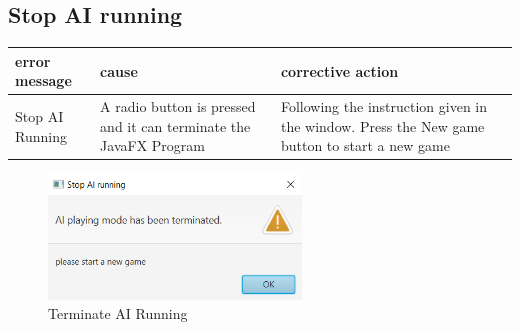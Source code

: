 
\subsection{Stop AI running}

\begin{table}[h]
	\centering
\begin{tabular}{p{2.5cm}@{\hskip 5mm}  p{5cm}@{\hskip 5mm} p{6.5cm}} 
		\toprule
		error message   & cause      & corrective action  \\ 
		\midrule
		\midrule
	    Stop AI Running & A radio button is pressed and it can terminate the JavaFX Program  &  Following the instruction given in the window. Press the New game button to start a new game \\ 
		\bottomrule
	\end{tabular}
\end{table}

\begin{figure}[h]
	\centering
	\includegraphics[width=0.6\textwidth]{image/StopAIRunning}
	\caption{Terminate AI Running}
	\label{fig:Terminate AI Running}
\end{figure}